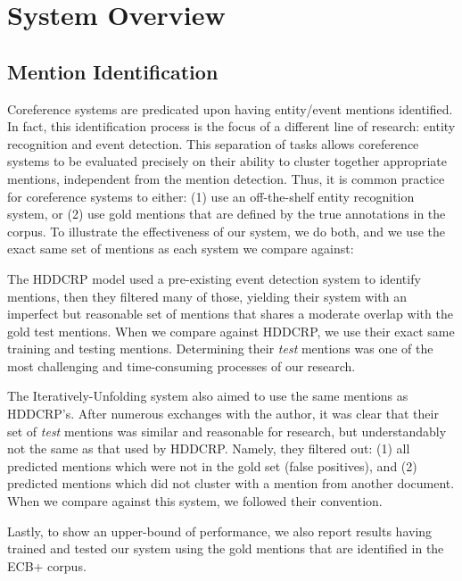 \documentclass[11pt,a4paper]{article}
\begin{document}

\section{System Overview}
\subsection{Mention Identification}
\label{sec:mentionid}
Coreference systems are predicated upon having entity/event mentions identified.  In fact, this identification process is the focus of a different line of research: entity recognition and event detection.  This separation of tasks allows coreference systems to be evaluated precisely on their ability to cluster together appropriate mentions, independent from the mention detection.  Thus, it is common practice for coreference systems to either: (1) use an off-the-shelf entity recognition system, or (2) use gold mentions that are defined by the true annotations in the corpus.  To illustrate the effectiveness of our system, we do both, and we use the exact same set of mentions as each system we compare against:

The HDDCRP model used a pre-existing event detection system to identify mentions, then they filtered many of those, yielding their system with an imperfect but reasonable set of mentions that shares a moderate overlap with the gold test mentions.  When we compare against HDDCRP, we use their exact same training and testing mentions.  Determining their \textit{test} mentions was one of the most challenging and time-consuming processes of our research.

The Iteratively-Unfolding system also aimed to use the same mentions as HDDCRP's.  After numerous exchanges with the author, it was clear that their set of \textit{test} mentions was similar and reasonable for research, but understandably not the same as that used by HDDCRP.  Namely, they filtered out: (1) all predicted mentions which were not in the gold set (false positives), and (2) predicted mentions which did not cluster with a mention from another document.  When we compare against this system, we followed their convention.

Lastly, to show an upper-bound of performance, we also report results having trained and tested our system using the gold mentions that are identified in the ECB+ corpus.
\end{document}
